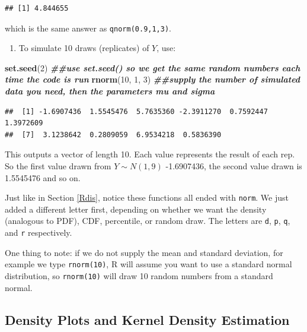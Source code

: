 \documentclass[
]{book}
\newenvironment{Shaded}{\begin{snugshade}}{\end{snugshade}}
\newcommand{\DecValTok}[1]{\textcolor[rgb]{0.00,0.00,0.81}{#1}}
\newcommand{\DocumentationTok}[1]{\textcolor[rgb]{0.56,0.35,0.01}{\textbf{\textit{#1}}}}
\newcommand{\FunctionTok}[1]{\textcolor[rgb]{0.13,0.29,0.53}{\textbf{#1}}}
\newcommand{\NormalTok}[1]{#1}
\providecommand{\tightlist}{%
  \setlength{\itemsep}{0pt}\setlength{\parskip}{0pt}}
\begin{document}
\begin{verbatim}
## [1] 4.844655
\end{verbatim}

which is the same answer as \texttt{qnorm(0.9,1,3)}.

\begin{enumerate}
\def\labelenumi{\arabic{enumi}.}
\setcounter{enumi}{3}
\tightlist
\item
  To simulate 10 draws (replicates) of \(Y\), use:
\end{enumerate}

\begin{Shaded}
\begin{Highlighting}[]
\FunctionTok{set.seed}\NormalTok{(}\DecValTok{2}\NormalTok{) }\DocumentationTok{\#\#use set.seed() so we get the same random numbers each time the code is run}
\FunctionTok{rnorm}\NormalTok{(}\DecValTok{10}\NormalTok{, }\DecValTok{1}\NormalTok{, }\DecValTok{3}\NormalTok{) }\DocumentationTok{\#\#supply the number of simulated data you need, then the parameters mu and sigma}
\end{Highlighting}
\end{Shaded}

\begin{verbatim}
##  [1] -1.6907436  1.5545476  5.7635360 -2.3911270  0.7592447  1.3972609
##  [7]  3.1238642  0.2809059  6.9534218  0.5836390
\end{verbatim}

This outputs a vector of length 10. Each value represents the result of each rep. So the first value drawn from \(Y \sim N(1,9)\) -1.6907436, the second value drawn is 1.5545476 and so on.

Just like in Section \ref{Rdis}, notice these functions all ended with \texttt{norm}. We just added a different letter first, depending on whether we want the density (analogous to PDF), CDF, percentile, or random draw. The letters are \texttt{d}, \texttt{p}, \texttt{q}, and \texttt{r} respectively.

One thing to note: if we do not supply the mean and standard deviation, for example we type \texttt{rnorm(10)}, R will assume you want to use a standard normal distribution, so \texttt{rnorm(10)} will draw 10 random numbers from a standard normal.

\hypertarget{KDE}{%
\subsection{Density Plots and Kernel Density Estimation}\label{KDE}}
\end{document}
